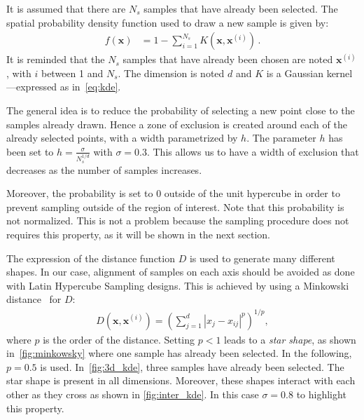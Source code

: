 It is assumed that there are $N_s$ samples that have already been selected. The spatial probability density function used to draw a new sample is given by:
\begin{align}
f(\mathbf{x}) &= 1 - \sum_{i=1}^{N_{s}} K\left(\mathbf{x},\mathbf{x}^{(i)}\right) \, .
\end{align}
It is reminded that the $N_s$ samples that have already been chosen are noted $\mathbf{x}^{(i)}$, with $i$ between 1 and $N_s$. The dimension is noted $d$ and $K$ is a Gaussian kernel---expressed as in~\cref{eq:kde}.

The general idea is to reduce the probability of selecting a new point close to the samples already drawn. Hence a zone of exclusion is created around each of the already selected points, with a width parametrized by $h$. The parameter $h$ has been set to $h = \frac{\sigma}{N_s^{1/d}}$ with $\sigma=0.3$. This allows us to have a width of exclusion that decreases as the number of samples increases.

Moreover, the probability is set to 0 outside of the unit hypercube in order to prevent sampling outside of the region of interest. Note that this probability is not normalized. This is not a problem because the sampling procedure does not requires this property, as it will be shown in the next section.

The expression of the distance function $D$ is used to generate many different shapes. In our case, alignment of samples on each axis should be avoided as done with Latin Hypercube Sampling designs. This is achieved by using a Minkowski distance~\citep{Cha2007} for $D$:
\begin{align}
D\left(\mathbf{x},\mathbf{x}^{(i)}\right)=\left(\sum_{j=1}^d |x_{j}-x_{ij}|^p\right)^{1/p},
\end{align}
where $p$ is the order of the distance. Setting $p < 1$ leads to a \emph{star shape}, as shown in~\cref{fig:minkowsky} where one sample has already been selected. In the following, $p=0.5$ is used. In~\cref{fig:3d_kde}, three samples have already been selected. The star shape is present in all dimensions. Moreover, these shapes interact with each other as they cross as shown in \cref{fig:inter_kde}. In this case $\sigma=0.8$ to highlight this property.

